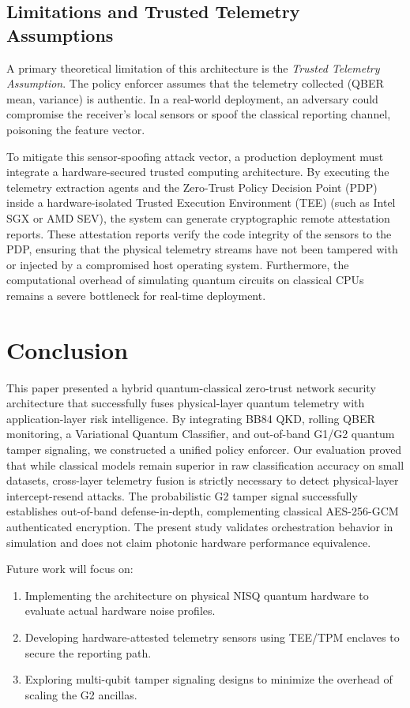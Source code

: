 \documentclass[conference]{IEEEtran}
\begin{document}
\subsection{Limitations and Trusted Telemetry Assumptions}
A primary theoretical limitation of this architecture is the \textit{Trusted Telemetry Assumption}. The policy enforcer assumes that the telemetry collected (QBER mean, variance) is authentic. In a real-world deployment, an adversary could compromise the receiver's local sensors or spoof the classical reporting channel, poisoning the feature vector. 

To mitigate this sensor-spoofing attack vector, a production deployment must integrate a hardware-secured trusted computing architecture. By executing the telemetry extraction agents and the Zero-Trust Policy Decision Point (PDP) inside a hardware-isolated Trusted Execution Environment (TEE) (such as Intel SGX or AMD SEV), the system can generate cryptographic remote attestation reports. These attestation reports verify the code integrity of the sensors to the PDP, ensuring that the physical telemetry streams have not been tampered with or injected by a compromised host operating system. Furthermore, the computational overhead of simulating quantum circuits on classical CPUs remains a severe bottleneck for real-time deployment.

\section{Conclusion}
This paper presented a hybrid quantum-classical zero-trust network security architecture that successfully fuses physical-layer quantum telemetry with application-layer risk intelligence. By integrating BB84 QKD, rolling QBER monitoring, a Variational Quantum Classifier, and out-of-band G1/G2 quantum tamper signaling, we constructed a unified policy enforcer. Our evaluation proved that while classical models remain superior in raw classification accuracy on small datasets, cross-layer telemetry fusion is strictly necessary to detect physical-layer intercept-resend attacks. The probabilistic G2 tamper signal successfully establishes out-of-band defense-in-depth, complementing classical AES-256-GCM authenticated encryption. The present study validates orchestration behavior in simulation and does not claim photonic hardware performance equivalence.

Future work will focus on:
\begin{enumerate}
\item Implementing the architecture on physical NISQ quantum hardware to evaluate actual hardware noise profiles.
\item Developing hardware-attested telemetry sensors using TEE/TPM enclaves to secure the reporting path.
\item Exploring multi-qubit tamper signaling designs to minimize the overhead of scaling the G2 ancillas.
\end{enumerate}
\end{document}
